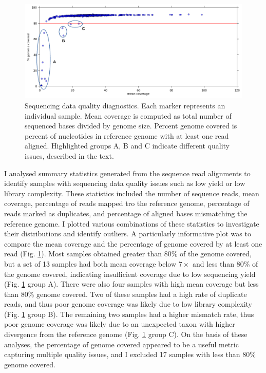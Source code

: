 \documentclass[a4paper,11pt,abstracton,hidelinks]{scrartcl}
\begin{document}
\begin{figure}[t!]
\centering
\includegraphics[width=\textwidth]{artwork/chapter3/coverage.pdf}
\caption{Sequencing data quality diagnostics.
%
Each marker represents an individual sample.
%
Mean coverage is computed as total number of sequenced bases divided by genome size.
%
Percent genome covered is percent of nucleotides in reference genome with at least one read aligned.
%
Highlighted groups A, B and C indicate different quality issues, described in the text.
}
%
\label{fig:coverage}
\end{figure}


I analysed summary statistics generated from the sequence read alignments to identify samples with sequencing data quality issues such as low yield or low library complexity.
%
These statistics included the number of sequence reads, mean coverage, percentage of reads mapped tro the reference genome, percentage of reads marked as duplicates, and percentage of aligned bases mismatching the reference genome.
%
I plotted various combinations of these statistics to investigate their distributions and identify outliers.
%
A particularly informative plot was to compare the mean coverage and the percentage of genome covered by at least one read (Fig. \ref{fig:coverage}).
%
Most samples obtained greater than 80\% of the genome covered, but a set of 13 samples had both mean coverage below $7\times$ and less than 80\% of the genome covered, indicating insufficient coverage due to low sequencing yield (Fig. \ref{fig:coverage} group A).
%
There were also four samples with high mean coverage but less than 80\% genome covered.
%
Two of these samples had a high rate of duplicate reads, and thus poor genome coverage was likely due to low library complexity (Fig. \ref{fig:coverage} group B).
%
The remaining two samples had a higher mismatch rate, thus poor genome coverage was likely due to an unexpected taxon with higher divergence from the reference genome (Fig. \ref{fig:coverage} group C).
%
On the basis of these analyses, the percentage of genome covered appeared to be a useful metric capturing multiple quality issues, and I excluded 17 samples with less than 80\% genome covered.
%
\end{document}
